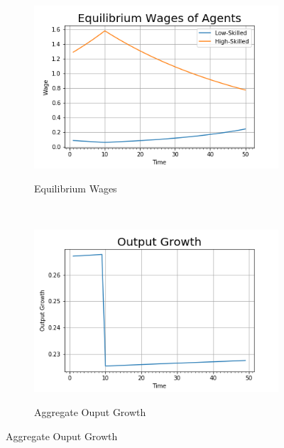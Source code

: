 \documentclass[11pt]{article}
\begin{document}
\begin{figure}[H]
      \begin{subfigure}[b]{0.5\textwidth}
        \centering
        \caption{Equilibrium Wages}
        \includegraphics[width=\textwidth]{wage_agents}
        \label{fig:no_tax_wage}
      \end{subfigure}%
      ~
      \begin{subfigure}[b]{0.5\textwidth}
        \centering
        \caption{Aggregate Ouput Growth}
        \includegraphics[width=\textwidth]{output_growth}
        \label{fig:no_tax_growth}
      \end{subfigure}
    \end{figure}
\end{document}
